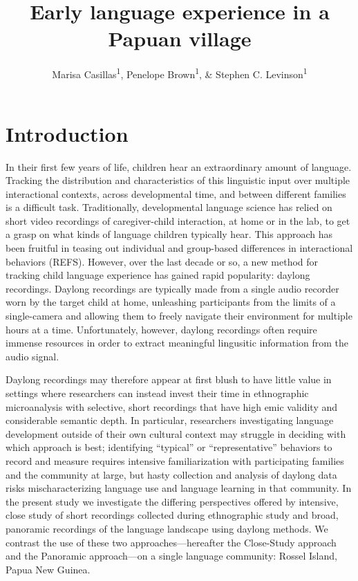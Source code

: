 \documentclass[,man,floatsintext]{apa6}
\title{Early language experience in a Papuan village}
\author{Marisa Casillas\textsuperscript{1}, Penelope Brown\textsuperscript{1},
\& Stephen C. Levinson\textsuperscript{1}}
\date{}
\affiliation{
\vspace{0.5cm}
\textsuperscript{1} Max Planck Institute for Psycholinguistics}
\begin{document}
\maketitle

\section{Introduction}\label{intro}

In their first few years of life, children hear an extraordinary amount
of language. Tracking the distribution and characteristics of this
linguistic input over multiple interactional contexts, across
developmental time, and between different families is a difficult task.
Traditionally, developmental language science has relied on short video
recordings of caregiver-child interaction, at home or in the lab, to get
a grasp on what kinds of language children typically hear. This approach
has been fruitful in teasing out individual and group-based differences
in interactional behaviors (REFS). However, over the last decade or so,
a new method for tracking child language experience has gained rapid
popularity: daylong recordings. Daylong recordings are typically made
from a single audio recorder worn by the target child at home,
unleashing participants from the limits of a single-camera and allowing
them to freely navigate their environment for multiple hours at a time.
Unfortunately, however, daylong recordings often require immense
resources in order to extract meaningful lingusitic information from the
audio signal.

Daylong recordings may therefore appear at first blush to have little
value in settings where researchers can instead invest their time in
ethnographic microanalysis with selective, short recordings that have
high emic validity and considerable semantic depth. In particular,
researchers investigating language development outside of their own
cultural context may struggle in deciding with which approach is best;
identifying \enquote{typical} or \enquote{representative} behaviors to
record and measure requires intensive familiarization with participating
families and the community at large, but hasty collection and analysis
of daylong data risks mischaracterizing language use and language
learning in that community. In the present study we investigate the
differing perspectives offered by intensive, close study of short
recordings collected during ethnographic study and broad, panoramic
recordings of the language landscape using daylong methods. We contrast
the use of these two approaches---hereafter the Close-Study approach and
the Panoramic approach---on a single language community: Rossel Island,
Papua New Guinea.
\end{document}
